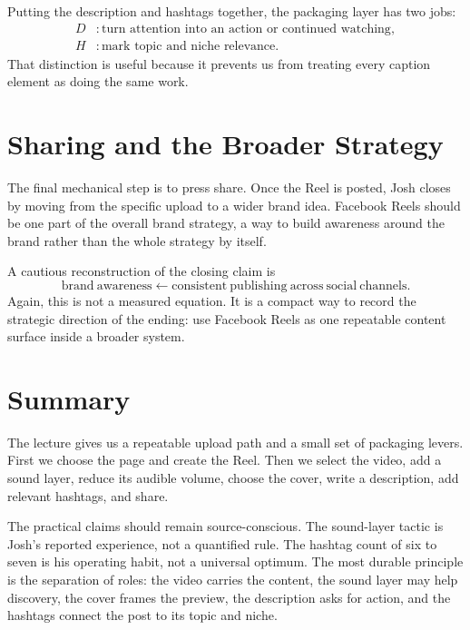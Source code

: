 Putting the description and hashtags together, the packaging layer has two jobs:
\begin{align}
D &: \text{turn attention into an action or continued watching}, \\
H &: \text{mark topic and niche relevance}.
\end{align}
That distinction is useful because it prevents us from treating every caption element as doing the same work.

\section{Sharing and the Broader Strategy}

The final mechanical step is to press share. Once the Reel is posted, Josh closes by moving from the specific upload to a wider brand idea. Facebook Reels should be one part of the overall brand strategy, a way to build awareness around the brand rather than the whole strategy by itself.

A cautious reconstruction of the closing claim is
\begin{equation}
\mathrm{brand\ awareness}
\leftarrow
\mathrm{consistent\ publishing\ across\ social\ channels}.
\end{equation}
Again, this is not a measured equation. It is a compact way to record the strategic direction of the ending: use Facebook Reels as one repeatable content surface inside a broader system.

\section{Summary}

The lecture gives us a repeatable upload path and a small set of packaging levers. First we choose the page and create the Reel. Then we select the video, add a sound layer, reduce its audible volume, choose the cover, write a description, add relevant hashtags, and share.

The practical claims should remain source-conscious. The sound-layer tactic is Josh's reported experience, not a quantified rule. The hashtag count of six to seven is his operating habit, not a universal optimum. The most durable principle is the separation of roles: the video carries the content, the sound layer may help discovery, the cover frames the preview, the description asks for action, and the hashtags connect the post to its topic and niche.